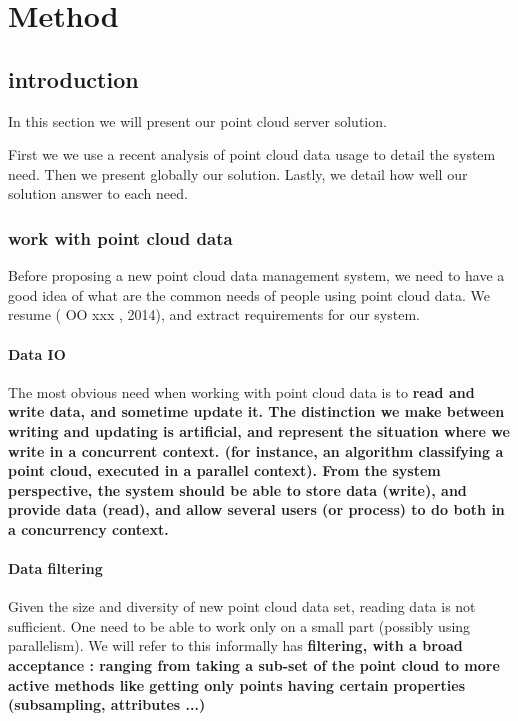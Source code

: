 

\section{Method}
	\subsection{introduction}
		In this section we will present our point cloud server solution.
	 
		First we  we use a recent analysis of point cloud data usage to detail the system need.
		Then we present globally our solution.
		Lastly, we detail how well our solution answer to each need.
		 
		\subsubsection{work with point cloud data}
			Before proposing a new point cloud data management system, we need to have a good idea of what are the common needs of people using point cloud data.
			We resume ( OO xxx , 2014), and extract requirements for our system. 
		 	\paragraph{Data IO}
		 		The most obvious need when working with point cloud data is to \bf {read} and \bf{write} data, and sometime \bf{update} it. 
		 		The distinction we make between writing and updating is artificial, and represent the situation where we write in a concurrent context.
		 		(for instance, an algorithm classifying a point cloud, executed in a parallel context).
		 		From the system perspective, the system should be able to store data (write), and provide data (read), and allow several users (or process) to do both in a concurrency context.
		 	\paragraph{Data filtering}
		 		Given the size and diversity of new point cloud data set, reading data is not sufficient. One need to be able to work only on a small part (possibly using parallelism).
		 		We will refer to this informally has \bf{filtering}, with a broad acceptance : ranging from taking a sub-set of the point cloud to  more active methods like getting only points having certain properties (subsampling, attributes ...)
		
